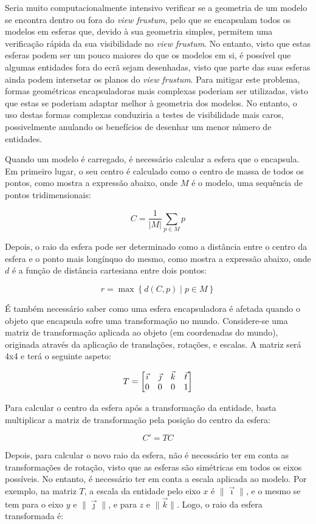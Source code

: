 \documentclass[12pt, a4paper]{article}
\begin{document}
Seria muito computacionalmente intensivo verificar se a geometria de um modelo se encontra dentro ou
fora do \emph{view frustum}, pelo que se encapsulam todos os modelos em esferas que, devido à sua
geometria simples, permitem uma verificação rápida da sua visibilidade no \emph{view frustum}. No
entanto, visto que estas esferas podem ser um pouco maiores do que os modelos em si, é possível que
algumas entidades fora do ecrã sejam desenhadas, visto que parte das suas esferas ainda podem
intersetar os planos do \emph{view frustum}. Para mitigar este problema, formas geométricas
encapsuladoras mais complexas poderiam ser utilizadas, visto que estas se poderiam adaptar melhor à
geometria dos modelos. No entanto, o uso destas formas complexas conduziria a testes de visibilidade
mais caros, possivelmente anulando os benefícios de desenhar um menor número de entidades.

Quando um modelo é carregado, é necessário calcular a esfera que o encapsula. Em primeiro lugar, o
seu centro é calculado como o centro de massa de todos os pontos, como mostra a expressão abaixo,
onde $M$ é o modelo, uma sequência de pontos tridimensionais:

$$
C = \frac{1}{|M|} \sum_{p \in M} p
$$

Depois, o raio da esfera pode ser determinado como a distância entre o centro da esfera e o ponto
mais longínquo do mesmo, como mostra a expressão abaixo, onde $d$ é a função de distância cartesiana
entre dois pontos:

$$
r = \max \left \lbrace d(C, p) \mid p \in M \right \rbrace
$$

É também necessário saber como uma esfera encapsuladora é afetada quando o objeto que encapsula
sofre uma transformação no mundo. Considere-se uma matriz de transformação aplicada ao objeto (em
coordenadas do mundo), originada através da aplicação de translações, rotações, e escalas. A matriz
será 4x4 e terá o seguinte aspeto:

$$
\bgroup
    T =
    \begin{bmatrix}
        \vec \imath & \vec \jmath & \vec k & \vec t \\
        0 & 0 & 0 & 1
    \end{bmatrix}
\egroup
$$

Para calcular o centro da esfera após a transformação da entidade, basta multiplicar a matriz de
transformação pela posição do centro da esfera:

$$
C' = T C
$$

Depois, para calcular o novo raio da esfera, não é necessário ter em conta as transformações de
rotação, visto que as esferas são simétricas em todos os eixos possíveis. No entanto, é necessário
ter em conta a escala aplicada ao modelo. Por exemplo, na matriz $T$, a escala da entidade pelo
eixo $x$ é $\lVert \vec \imath \rVert$, e o mesmo se tem para o eixo $y$ e
$\lVert \vec \jmath \rVert$, e para $z$ e $\lVert \vec k \rVert$. Logo, o raio da esfera
transformada é:
\end{document}
